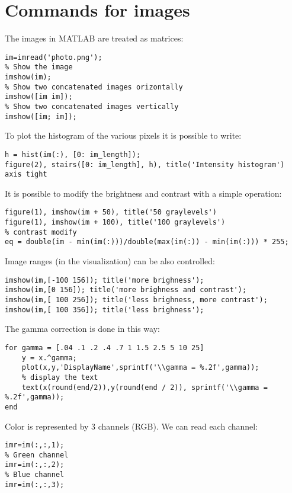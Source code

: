 \documentclass[12pt, a4paper]{report}
\newtheorem[style=M,bodystyle=\normalfont]{theorem}{Theorem}
\newtheorem[style=M,bodystyle=\normalfont]{corollary}{Corollary}
\newtheorem[style=M,bodystyle=\normalfont]{lemma}{Lemma}
\newtheorem[style=M,bodystyle=\normalfont]{definition}{Definition}
\begin{document}
    \section{Commands for images}
    The images in MATLAB are treated as matrices:
    \begin{lstlisting}[frame=single, numbers=none, style=Matlab-bw]
im=imread('photo.png');
% Show the image
imshow(im);
% Show two concatenated images orizontally
imshow([im im]);
% Show two concatenated images vertically
imshow([im; im]);
    \end{lstlisting}
    To plot the histogram of the various pixels it is possible to write: 
    \begin{lstlisting}[frame=single, numbers=none, style=Matlab-bw]
h = hist(im(:), [0: im_length]);
figure(2), stairs([0: im_length], h), title('Intensity histogram')
axis tight
    \end{lstlisting}
    It is possible to modify the brightness and contrast with a simple operation:
    \begin{lstlisting}[frame=single, numbers=none, style=Matlab-bw]
figure(1), imshow(im + 50), title('50 graylevels')
figure(1), imshow(im + 100), title('100 graylevels')
% contrast modify
eq = double(im - min(im(:)))/double(max(im(:)) - min(im(:))) * 255;
    \end{lstlisting}
    Image ranges (in the visualization) can be also controlled:
    \begin{lstlisting}[frame=single, numbers=none, style=Matlab-bw]
imshow(im,[-100 156]); title('more brighness');
imshow(im,[0 156]); title('more brighness and contrast');
imshow(im,[ 100 256]); title('less brighness, more contrast');
imshow(im,[ 100 356]); title('less brighness');
    \end{lstlisting}
    The gamma correction is done in this way: 
    \begin{lstlisting}[frame=single, numbers=none, style=Matlab-bw]
for gamma = [.04 .1 .2 .4 .7 1 1.5 2.5 5 10 25]
    y = x.^gamma;
    plot(x,y,'DisplayName',sprintf('\\gamma = %.2f',gamma));
    % display the text
    text(x(round(end/2)),y(round(end / 2)), sprintf('\\gamma = %.2f',gamma));
end
    \end{lstlisting}
    Color is represented by 3 channels (RGB). We can read each channel:
    \begin{lstlisting}[frame=single, numbers=none, style=Matlab-bw]
% Red channel
imr=im(:,:,1);
% Green channel
imr=im(:,:,2);
% Blue channel
imr=im(:,:,3);
    \end{lstlisting}
\end{document}
